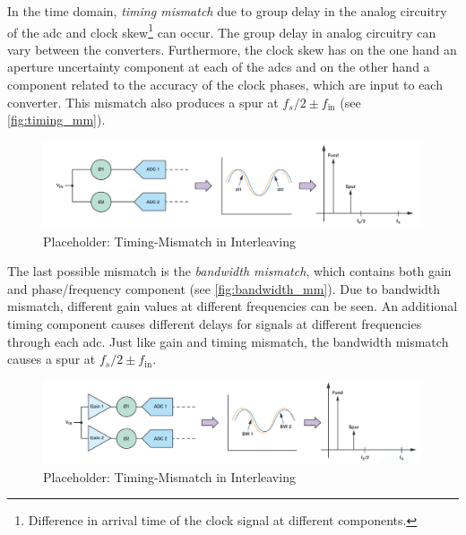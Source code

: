 In the time domain, \textit{timing mismatch} due to group delay in the analog circuitry of the \gls{adc} and clock skew\footnote{Difference in arrival time of the clock signal at different components.} can occur. The group delay in analog circuitry can vary between the converters. Furthermore, the clock skew has on the one hand an aperture uncertainty component at each of the \glspl{adc} and on the other hand a component related to the accuracy of the clock phases, which are input to each converter. \cite{Harris2019} This mismatch also produces a spur at $f_s/2 \pm f_{\text{in}}$ (see \autoref{fig:timing_mm}).

\begin{figure}[tbh]
	\centering
	\includegraphics[width = \textwidth]{chap/02-theory/img/timing_mm}
	\caption{Placeholder: Timing-Mismatch in Interleaving \cite{Harris2019}}
	\label{fig:timing_mm}
\end{figure}

The last possible mismatch is the \textit{bandwidth mismatch}, which contains both gain and phase/frequency component (see \autoref{fig:bandwidth_mm}). Due to bandwidth mismatch, different gain values at different frequencies can be seen. An additional timing component causes different delays for signals at different frequencies through each \gls{adc}. Just like gain and timing mismatch, the bandwidth mismatch causes a spur at $f_s/2 \pm f_{\text{in}}$.
\begin{figure}[tbh]
	\centering
	\includegraphics[width = \textwidth]{chap/02-theory/img/bandwidth_mm}
	\caption{Placeholder: Timing-Mismatch in Interleaving \cite{Harris2019}}
	\label{fig:bandwidth_mm}
\end{figure}